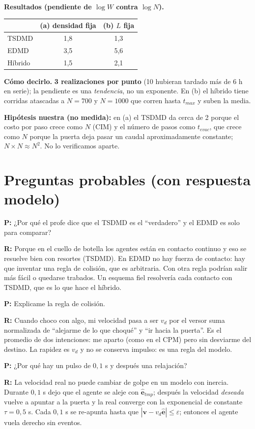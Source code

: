 \documentclass[10.5pt,a4paper]{article}
\newcommand{\vect}[1]{\mathbf{#1}}
\newcommand{\hipotesis}[1]{\par\colorbox{hipo}{\parbox{\dimexpr\linewidth-2\fboxsep}{\textbf{Hipótesis nuestra (no medida):} #1}}\par}
\newcommand{\pr}[1]{\par\textbf{P:} #1\par\nobreak}
\newcommand{\rp}[1]{\textbf{R:} #1\par}
\begin{document}
\textbf{Resultados (pendiente de $\log W$ contra $\log N$).}
\begin{center}\small
\begin{tabular}{@{}lcc@{}}
\toprule
 & (a) densidad fija & (b) $L$ fija \\ \midrule
TSDMD & 1,8 & 1,3 \\
EDMD & 3,5 & 5,6 \\
Híbrido & 1,5 & 2,1 \\ \bottomrule
\end{tabular}
\end{center}
\textbf{Cómo decirlo.} \textbf{3 realizaciones por punto} (10 hubieran tardado más de 6 h en serie); la pendiente es una \emph{tendencia}, no un exponente. En (b) el híbrido tiene corridas atascadas a $N=700$ y $N=1000$ que corren hasta $t_{max}$ y suben la media.
\hipotesis{en (a) el TSDMD da cerca de 2 porque el costo por paso crece como $N$ (CIM) y el número de pasos como $t_{evac}$, que crece como $N$ porque la puerta deja pasar un caudal aproximadamente constante; $N\times N\approx N^2$. No lo verificamos aparte.}

\section{Preguntas probables (con respuesta modelo)}

\pr{¿Por qué el profe dice que el TSDMD es el ``verdadero'' y el EDMD es solo para comparar?}
\rp{Porque en el cuello de botella los agentes están en contacto continuo y eso se resuelve bien con resortes (TSDMD). En EDMD no hay fuerza de contacto: hay que inventar una regla de colisión, que es arbitraria. Con otra regla podrían salir más fácil o quedarse trabados. Un esquema fiel resolvería cada contacto con TSDMD, que es lo que hace el híbrido.}

\pr{Explicame la regla de colisión.}
\rp{Cuando choco con algo, mi velocidad pasa a ser $v_d$ por el versor suma normalizada de ``alejarme de lo que choqué'' y ``ir hacia la puerta''. Es el promedio de dos intenciones: me aparto (como en el CPM) pero sin desviarme del destino. La rapidez es $v_d$ y no se conserva impulso: es una regla del modelo.}

\pr{¿Por qué hay un pulso de $0{,}1$ s y después una relajación?}
\rp{La velocidad real no puede cambiar de golpe en un modelo con inercia. Durante $0{,}1$ s dejo que el agente se aleje con $\hat{\vect e}_{tmp}$; después la velocidad \emph{deseada} vuelve a apuntar a la puerta y la real converge con la exponencial de constante $\tau=0{,}5$ s. Cada $0{,}1$ s se re-apunta hasta que $|\vect v-v_d\hat{\vect e}|\leq\varepsilon$; entonces el agente vuela derecho sin eventos.}
\end{document}
